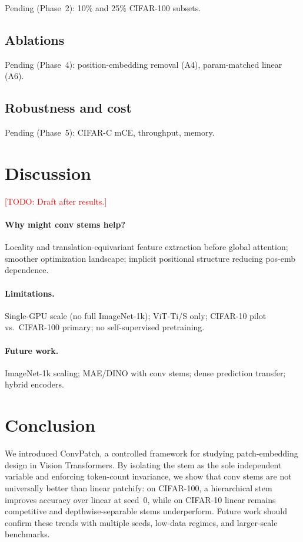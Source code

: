 \documentclass[10pt,twocolumn]{article}
\newcommand{\todo}[1]{\textcolor{red}{[TODO: #1]}}
\begin{document}
Pending (Phase~2): 10\% and 25\% CIFAR-100 subsets.

\subsection{Ablations}

Pending (Phase~4): position-embedding removal (A4), param-matched linear (A6).

\subsection{Robustness and cost}

Pending (Phase~5): CIFAR-C mCE, throughput, memory.

\section{Discussion}
\label{sec:discussion}

\todo{Draft after results.}

\paragraph{Why might conv stems help?}
Locality and translation-equivariant feature extraction before global attention; smoother optimization landscape; implicit positional structure reducing pos-emb dependence.

\paragraph{Limitations.}
Single-GPU scale (no full ImageNet-1k); ViT-Ti/S only; CIFAR-10 pilot vs.\ CIFAR-100 primary; no self-supervised pretraining.

\paragraph{Future work.}
ImageNet-1k scaling; MAE/DINO with conv stems; dense prediction transfer; hybrid encoders.

\section{Conclusion}
\label{sec:conclusion}

We introduced ConvPatch, a controlled framework for studying patch-embedding design in Vision Transformers.
By isolating the stem as the sole independent variable and enforcing token-count invariance, we show that conv stems are not universally better than linear patchify: on CIFAR-100, a hierarchical stem improves accuracy over linear at seed~0, while on CIFAR-10 linear remains competitive and depthwise-separable stems underperform.
Future work should confirm these trends with multiple seeds, low-data regimes, and larger-scale benchmarks.



\end{document}
